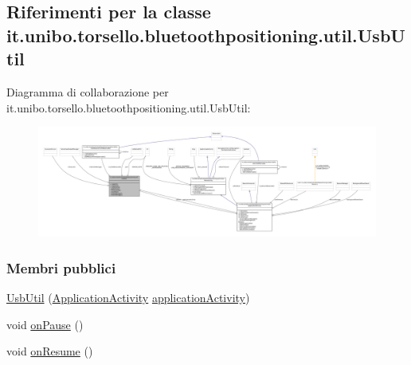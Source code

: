 \hypertarget{classit_1_1unibo_1_1torsello_1_1bluetoothpositioning_1_1util_1_1UsbUtil}{}\subsection{Riferimenti per la classe it.\+unibo.\+torsello.\+bluetoothpositioning.\+util.\+Usb\+Util}
\label{classit_1_1unibo_1_1torsello_1_1bluetoothpositioning_1_1util_1_1UsbUtil}


Diagramma di collaborazione per it.\+unibo.\+torsello.\+bluetoothpositioning.\+util.\+Usb\+Util\+:
\nopagebreak
\begin{figure}[H]
\begin{center}
\leavevmode
\includegraphics[width=350pt]{classit_1_1unibo_1_1torsello_1_1bluetoothpositioning_1_1util_1_1UsbUtil__coll__graph}
\end{center}
\end{figure}
\subsubsection*{Membri pubblici}
\begin{DoxyCompactItemize}
\item 
\hyperlink{classit_1_1unibo_1_1torsello_1_1bluetoothpositioning_1_1util_1_1UsbUtil_aff938c0dddb8fd4549b0a3dddba94473_aff938c0dddb8fd4549b0a3dddba94473}{Usb\+Util} (\hyperlink{classit_1_1unibo_1_1torsello_1_1bluetoothpositioning_1_1activities_1_1ApplicationActivity}{Application\+Activity} \hyperlink{classit_1_1unibo_1_1torsello_1_1bluetoothpositioning_1_1util_1_1UsbUtil_afdcd78c04f043fafe29eb2cc006b5843_afdcd78c04f043fafe29eb2cc006b5843}{application\+Activity})
\item 
void \hyperlink{classit_1_1unibo_1_1torsello_1_1bluetoothpositioning_1_1util_1_1UsbUtil_ab4f2c73fa6b776c9d4967ff89da0d8ca_ab4f2c73fa6b776c9d4967ff89da0d8ca}{on\+Pause} ()
\item 
void \hyperlink{classit_1_1unibo_1_1torsello_1_1bluetoothpositioning_1_1util_1_1UsbUtil_ae814610c8dc793fea3a9a314fb26e3cb_ae814610c8dc793fea3a9a314fb26e3cb}{on\+Resume} ()
\end{DoxyCompactItemize}
